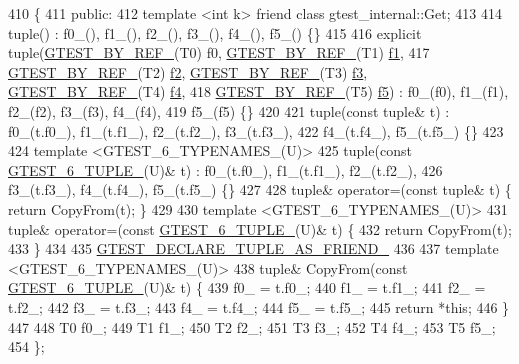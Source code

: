 \begin{DoxyCode}
410                         \{
411  \textcolor{keyword}{public}:
412   \textcolor{keyword}{template} <\textcolor{keywordtype}{int} k> \textcolor{keyword}{friend} \textcolor{keyword}{class }gtest\_internal::Get;
413 
414   tuple() : f0\_(), f1\_(), f2\_(), f3\_(), f4\_(), f5\_() \{\}
415 
416   \textcolor{keyword}{explicit} tuple(\hyperlink{gtest-tuple_8h_adcf9057737a411d833fac0382c13a181}{GTEST\_BY\_REF\_}(T0) f0, \hyperlink{gtest-tuple_8h_adcf9057737a411d833fac0382c13a181}{GTEST\_BY\_REF\_}(T1) 
      \hyperlink{namespacestd_1_1tr1_a9c0fa65b105f8e2f58ba59ecf75fd000}{f1},
417       \hyperlink{gtest-tuple_8h_adcf9057737a411d833fac0382c13a181}{GTEST\_BY\_REF\_}(T2) \hyperlink{namespacestd_1_1tr1_a87dd9e009868361317f587126dba63d4}{f2}, \hyperlink{gtest-tuple_8h_adcf9057737a411d833fac0382c13a181}{GTEST\_BY\_REF\_}(T3) \hyperlink{namespacestd_1_1tr1_a0f7c3b47d27d42d82d1a333ea420ce4e}{f3}, 
      \hyperlink{gtest-tuple_8h_adcf9057737a411d833fac0382c13a181}{GTEST\_BY\_REF\_}(T4) \hyperlink{namespacestd_1_1tr1_adc796e02b7385d526aff708189564f67}{f4},
418       \hyperlink{gtest-tuple_8h_adcf9057737a411d833fac0382c13a181}{GTEST\_BY\_REF\_}(T5) \hyperlink{namespacestd_1_1tr1_a9c1eb66b2b2fa321942af95405232a0d}{f5}) : f0\_(f0), f1\_(f1), f2\_(f2), f3\_(f3), f4\_(f4),
419       f5\_(f5) \{\}
420 
421   tuple(\textcolor{keyword}{const} tuple& t) : f0\_(t.f0\_), f1\_(t.f1\_), f2\_(t.f2\_), f3\_(t.f3\_),
422       f4\_(t.f4\_), f5\_(t.f5\_) \{\}
423 
424   \textcolor{keyword}{template} <GTEST\_6\_TYPENAMES\_(U)>
425   tuple(\textcolor{keyword}{const} \hyperlink{gtest-tuple_8h_a53f36c86a979ed8285bf3c6f82f16483}{GTEST\_6\_TUPLE\_}(U)& t) : f0\_(t.f0\_), f1\_(t.f1\_), f2\_(t.f2\_),
426       f3\_(t.f3\_), f4\_(t.f4\_), f5\_(t.f5\_) \{\}
427 
428   tuple& operator=(\textcolor{keyword}{const} tuple& t) \{ \textcolor{keywordflow}{return} CopyFrom(t); \}
429 
430   \textcolor{keyword}{template} <GTEST\_6\_TYPENAMES\_(U)>
431   tuple& operator=(\textcolor{keyword}{const} \hyperlink{gtest-tuple_8h_a53f36c86a979ed8285bf3c6f82f16483}{GTEST\_6\_TUPLE\_}(U)& t) \{
432     \textcolor{keywordflow}{return} CopyFrom(t);
433   \}
434 
435   \hyperlink{gtest-tuple_8h_a2b20671273f514a88a6e9b8328e5f257}{GTEST\_DECLARE\_TUPLE\_AS\_FRIEND\_}
436 
437   \textcolor{keyword}{template} <GTEST\_6\_TYPENAMES\_(U)>
438   tuple& CopyFrom(\textcolor{keyword}{const} \hyperlink{gtest-tuple_8h_a53f36c86a979ed8285bf3c6f82f16483}{GTEST\_6\_TUPLE\_}(U)& t) \{
439     f0\_ = t.f0\_;
440     f1\_ = t.f1\_;
441     f2\_ = t.f2\_;
442     f3\_ = t.f3\_;
443     f4\_ = t.f4\_;
444     f5\_ = t.f5\_;
445     \textcolor{keywordflow}{return} *\textcolor{keyword}{this};
446   \}
447 
448   T0 f0\_;
449   T1 f1\_;
450   T2 f2\_;
451   T3 f3\_;
452   T4 f4\_;
453   T5 f5\_;
454 \};
\end{DoxyCode}
